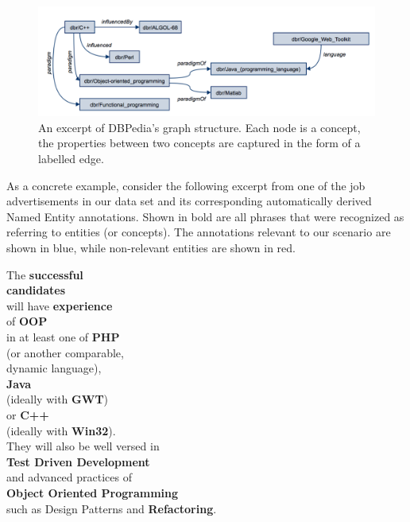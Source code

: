 \documentclass[conference]{IEEEtran}
\begin{document}
\begin{figure}[!htb]
\centering
\includegraphics[scale=0.4]{../figs/dbpedia-example-graph.png}
\caption{An excerpt of DBPedia's graph structure. Each node is a concept, the properties between two concepts are captured in the form of a labelled edge.}
\label{fig:dbpedia-example}
\end{figure}


As a concrete example, consider the following excerpt from one of the job
advertisements in our data set and its corresponding automatically derived Named
Entity annotations. Shown in bold are all phrases that were recognized as
referring to entities (or concepts). The annotations relevant to our scenario
are shown in blue, while non-relevant entities are shown in red.  \vspace{1cm}

{\small

\noindent The \textbf{successful} \\
\textbf{candidates}  \\
will have \textbf{experience} \\
of \textbf{OOP} \\
in at least one of \textbf{PHP} \\
(or another comparable,\\
dynamic language), \\
\textbf{Java} \\
(ideally with \textbf{GWT}) \\
or \textbf{C++} \\
(ideally with \textbf{Win32}). \\
They will also be well versed in\\
\textbf{Test Driven Development} \\
and advanced practices of\\
{\footnotesize\textbf{Object Oriented Programming}}  \\
such as Design Patterns and \textbf{Refactoring}. }\\
\end{document}
